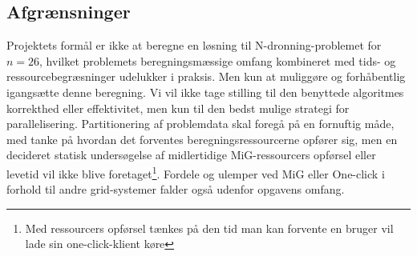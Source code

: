 \subsection*{Afgrænsninger}
Projektets formål er ikke at beregne en løsning til N-dronning-problemet for $n=26$, hvilket problemets beregningsmæssige omfang kombineret med tids- og ressourcebegræsninger udelukker i praksis. Men kun at muliggøre og forhåbentlig igangsætte denne beregning. 
Vi vil ikke tage stilling til den benyttede algoritmes korrekthed eller effektivitet, men kun til den bedst mulige strategi for parallelisering. Partitionering af problemdata skal foregå på en fornuftig måde, med tanke på hvordan det forventes beregningsressourcerne opfører sig, men en decideret statisk undersøgelse af midlertidige MiG-ressourcers opførsel eller levetid vil ikke blive foretaget\footnote{Med ressourcers opførsel tænkes på den tid man kan forvente en bruger vil lade sin one-click-klient køre}. Fordele og ulemper ved MiG eller One-click i forhold til andre grid-systemer falder også udenfor opgavens omfang. 
